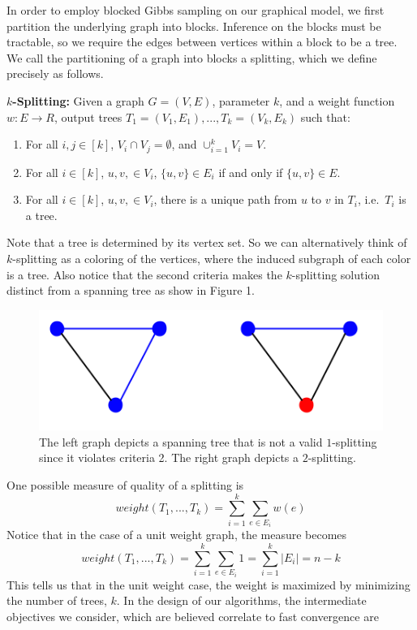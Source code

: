 \documentclass{article} %
\begin{document}
In order to employ blocked Gibbs sampling on our graphical model, we first partition the underlying graph into blocks. Inference on the blocks must be tractable, so we require the edges between vertices within a block to be a tree. We call the partitioning of a graph into blocks a splitting, which we define precisely as follows.

\noindent\textbf{$k$-Splitting:} Given a graph $G=(V,E)$, parameter $k$, and a weight function $w:E\rightarrow R$, output trees $T_1=(V_1,E_1),...,T_k=(V_k,E_k)$ such that:
\begin{enumerate}
\item For all $i,j\in[k]$, $V_i\cap V_j=\emptyset$, and $\cup_{i=1}^k V_i=V$.
\item For all $i\in[k]$, $u,v,\in V_i$, $\{u,v\}\in E_i$ if and only if $\{u,v\}\in E$.
\item For all $i\in[k]$, $u,v,\in V_i$, there is a unique path from $u$ to $v$ in $T_i$, i.e.~$T_i$ is a tree.
\end{enumerate}
Note that a tree is determined by its vertex set. So we can alternatively think of $k$-splitting as a coloring of the vertices, where the induced subgraph of each color is a tree. Also notice that the second criteria makes the $k$-splitting solution distinct from a spanning tree as show in Figure 1.
\begin{figure}
\begin{center}\includegraphics[scale=.5]{STvKS.png}\end{center}
\caption{The left graph depicts a spanning tree that is not a valid $1$-splitting since it violates criteria 2. The right graph depicts a $2$-splitting.}
\end{figure}

One possible measure of quality of a splitting is
\[
weight(T_1,...,T_k)=\sum_{i=1}^k\sum_{e\in E_i}w(e)
\]
Notice that in the case of a unit weight graph, the measure becomes
\[
weight(T_1,...,T_k)=\sum_{i=1}^k\sum_{e\in E_i}1=\sum_{i=1}^k|E_i|=n-k
\]
This tells us that in the unit weight case, the weight is maximized by minimizing the number of trees, $k$. In the design of our algorithms, the intermediate objectives we consider, which are believed correlate to fast convergence are 
\end{document}
